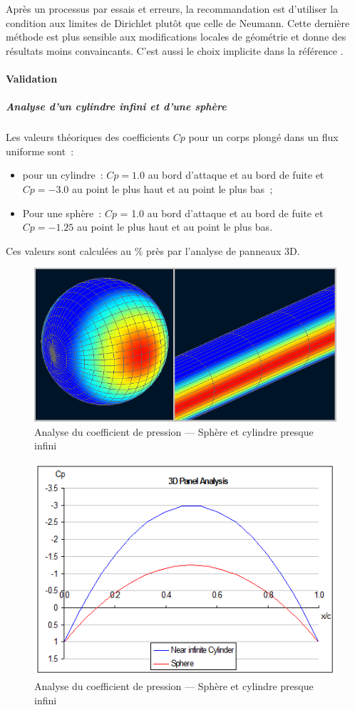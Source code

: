 \documentclass[a4paper,twoside,12pt,dvips]{article}
\begin{document}
Après un processus par essais et erreurs, la recommandation est d’utiliser 
la condition aux limites de Dirichlet plutôt que celle de Neumann. Cette 
dernière méthode est plus sensible aux modifications locales de géométrie 
et donne des résultats moins convaincants. C’est aussi le choix implicite
dans la référence \cite{Maskew}.

\paragraph{Validation}

\subparagraph{Analyse d’un cylindre infini et d’une sphère}

Les valeurs théoriques des coefficients $Cp$ pour un corps plongé dans un 
flux uniforme sont~:

\begin{itemize}
	\item pour un cylindre~: $Cp = 1.0$ au bord d’attaque et au bord de fuite 
	et $Cp = -3.0$ au point le plus haut et au point le plus bas~;
	\item Pour une sphère~: $Cp$ = 1.0 au bord d’attaque et au bord de fuite et 
	$Cp = -1.25$ au point le plus haut et au point le plus bas.
\end{itemize}

Ces valeurs sont calculées au \% près par l’analyse de panneaux 3D.


\begin{figure}[H]
	\centering
	\includegraphics[width=0.7\linewidth]{img-21}
	\caption{Analyse du coefficient de pression — Sphère et cylindre presque
	infini}
	\label{img:analyse_coefficient_pression_1}
\end{figure}

\begin{figure}[H]
	\centering
	\includegraphics[width=0.7\linewidth]{img-22}
	\caption{Analyse du coefficient de pression — Sphère et cylindre presque
	infini}
	\label{img:analyse_coefficient_pression_2}
\end{figure}
\end{document}
